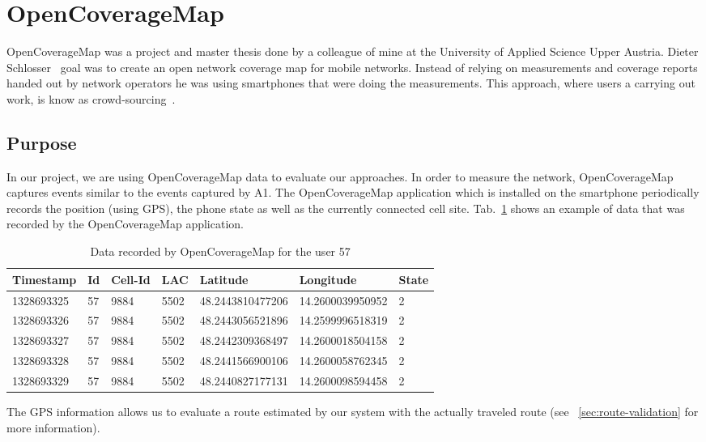 \section{OpenCoverageMap}
OpenCoverageMap was a project and  master thesis done by a colleague of mine at the University of Applied Science Upper Austria. Dieter Schlosser~\cite{Schlosser2012} goal was to create an open network coverage map for mobile networks. Instead of relying on measurements and coverage reports handed out by network operators he was using smartphones that were doing the measurements. This approach, where users a carrying out work, is know as crowd-sourcing~\cite{Surowiecki2004}.
\subsection{Purpose}
In our project, we are using OpenCoverageMap data to evaluate our approaches. In order to measure the network, OpenCoverageMap captures events similar to the events captured by A1.
The OpenCoverageMap application which is installed on the smartphone periodically records the position (using GPS), the phone state as well as the currently connected cell site. Tab.\ \ref{tab:ocmrecord} shows an example of data that was recorded by the OpenCoverageMap application.
\begin{table}
	\begin{tabular}{|l|l|l|l|l|l|l|}  \hline
		\textbf{Timestamp} & \textbf{Id} & \textbf{Cell-Id} & \textbf{LAC} & \textbf{Latitude} & \textbf{Longitude} & \textbf{State} \\    \hline 1328693325 & 57         & 9884   & 5502 & 48.2443810477206 & 14.2600039950952 & 2 \\  \hline
		1328693326 & 57         & 9884   & 5502 & 48.2443056521896 & 14.2599996518319 & 2\\  \hline
		1328693327 & 57         & 9884   & 5502 & 48.2442309368497 & 14.2600018504158 & 2\\  \hline
		1328693328 & 57         & 9884   & 5502 & 48.2441566900106 & 14.2600058762345 & 2\\  \hline
		1328693329 & 57         & 9884   & 5502 & 48.2440827177131 & 14.2600098594458 & 2\\  \hline
	\end{tabular}
	\caption{Data recorded by OpenCoverageMap for the user 57}
	\label{tab:ocmrecord}
\end{table}
The GPS information allows us to evaluate a route estimated by our system with the actually traveled route (see ~\ref{sec:route-validation} for more information).
